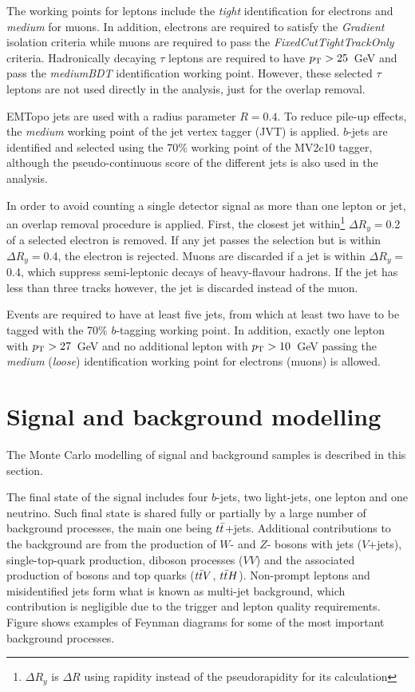 The working points for leptons include the \textit{tight} identification for electrons and \textit{medium} for muons. In addition, electrons are required to satisfy the \textit{Gradient} isolation criteria while muons are required to pass the \textit{FixedCutTightTrackOnly} criteria. Hadronically decaying $\tau$ leptons are required to have $p_{\text{T}}>25$~GeV and pass the \textit{mediumBDT} identification working point. However, these selected $\tau$ leptons are not used directly in the analysis, just for the overlap removal.

EMTopo jets are used with a radius parameter $R=0.4$. To reduce pile-up effects, the \textit{medium} working point of the jet vertex tagger (JVT) is applied. 
$b$-jets are identified and selected using the 70\% working point of the MV2c10 tagger, although the pseudo-continuous score of the different jets is also used in the analysis.

In order to avoid counting a single detector signal as more than one lepton or jet, an overlap removal procedure is applied. First, the closest jet within\footnote{$\Delta R_y$ is $\Delta R$ using rapidity instead of the pseudorapidity for its calculation} $\Delta R_y=$0.2 of a selected electron is removed. If any jet passes the selection but is within $\Delta R_y=$0.4, the electron is rejected. Muons are discarded if a jet is within $\Delta R_y=$0.4, which suppress semi-leptonic decays of heavy-flavour hadrons. If the jet has less than three tracks however, the jet is discarded instead of the muon.

Events are required to have at least five jets, from which at least two have to be tagged with the 70\% $b$-tagging working point. In addition, exactly one lepton with $p_{\text{T}}>27$~GeV and no additional lepton with $p_{\text{T}}>10$~GeV passing the \textit{medium} (\textit{loose}) identification working point for electrons (muons) is allowed.

\section{Signal and background modelling}
\label{Hplustb:Sectionmodelling}
The Monte Carlo modelling of signal and background samples is described in this section.

The final state of the signal includes four $b$-jets, two light-jets, one lepton and one neutrino. Such final state is shared fully or partially by a large number of background processes, the main one being $t\bar{t}$+jets. Additional contributions to the background are from the production of $W$- and $Z$- bosons with jets ($V$+jets), single-top-quark production, diboson processes ($VV$) and the associated production of bosons and top quarks ($t\bar{t} V$, $t\bar{t} H$). Non-prompt leptons and misidentified jets form what is known as multi-jet background, which contribution is negligible due to the trigger and lepton quality requirements. Figure shows examples of Feynman diagrams for some of the most important background processes.

